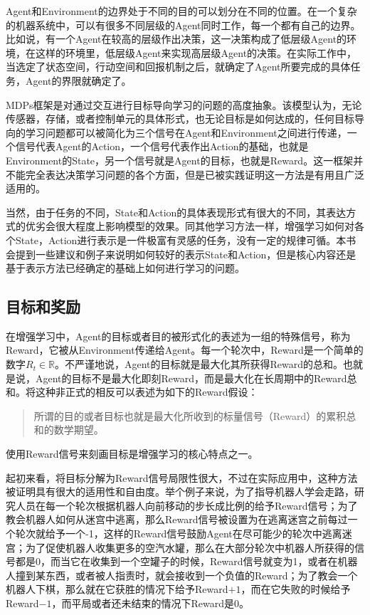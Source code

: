 \documentclass{ctexart}
\begin{document}
            Agent和Environment的边界处于不同的目的可以划分在不同的位置。在一个复杂的机器系统中，可以有很多不同层级的Agent同时工作，每一个都有自己的边界。比如说，有一个Agent在较高的层级作出决策，这一决策构成了低层级Agent的环境，在这样的环境里，低层级Agent来实现高层级Agent的决策。在实际工作中，当选定了状态空间，行动空间和回报机制之后，就确定了Agent所要完成的具体任务，Agent的界限就确定了。

            MDPs框架是对通过交互进行目标导向学习的问题的高度抽象。该模型认为，无论传感器，存储，或者控制单元的具体形式，也无论目标是如何达成的，任何目标导向的学习问题都可以被简化为三个信号在Agent和Environment之间进行传递，一个信号代表Agent的Action，一个信号代表作出Action的基础，也就是Environment的State，另一个信号就是Agent的目标，也就是Reward。这一框架并不能完全表达决策学习问题的各个方面，但是已被实践证明这一方法是有用且广泛适用的。

            当然，由于任务的不同，State和Action的具体表现形式有很大的不同，其表达方式的优劣会很大程度上影响模型的效果。同其他学习方法一样，增强学习如何对各个State，Action进行表示是一件极富有灵感的任务，没有一定的规律可循。本书会提到一些建议和例子来说明如何较好的表示State和Action，但是核心内容还是基于表示方法已经确定的基础上如何进行学习的问题。

        \subsection{目标和奖励}
            在增强学习中，Agent的目标或者目的被形式化的表述为一组的特殊信号，称为Reward，它被从Environment传递给Agent。每一个轮次中，Reward是一个简单的数字$R_t\in \mathbb{R}$。不严谨地说，Agent的目标就是最大化其所获得Reward的总和。也就是说，Agent的目标不是最大化即刻Reward，而是最大化在长周期中的Reward总和。将这种非正式的相反可以表述为如下的Reward假设：

                \begin{quote}
                  所谓的目的或者目标也就是最大化所收到的标量信号（Reward）的累积总和的数学期望。
                \end{quote}

            使用Reward信号来刻画目标是增强学习的核心特点之一。

            起初来看，将目标分解为Reward信号局限性很大，不过在实际应用中，这种方法被证明具有很大的适用性和自由度。举个例子来说，为了指导机器人学会走路，研究人员在每一个轮次根据机器人向前移动的步长成比例的给予Reward信号；为了教会机器人如何从迷宫中逃离，那么Reward信号被设置为在逃离迷宫之前每过一个轮次就给予一个-1，这样的Reward信号鼓励Agent在尽可能少的轮次中逃离迷宫；为了促使机器人收集更多的空汽水罐，那么在大部分轮次中机器人所获得的信号都是0，而当它在收集到一个空罐子的时候，Reward信号就变为1，或者在机器人撞到某东西，或者被人指责时，就会接收到一个负值的Reward；为了教会一个机器人下棋，那么就在它获胜的情况下给予Reward$+1$，而在它失败的时候给予Reward$-1$，而平局或者还未结束的情况下Reward是$0$。
\end{document}
